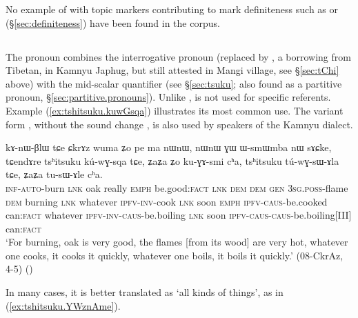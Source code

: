 No example of  with topic markers contributing to mark definiteness such as  or  (§\ref{sec:definiteness}) have been found in the corpus.

\subsection{} \label{sec:tshitsuku}
The pronoun  combines the  interrogative pronoun  (replaced by , a borrowing from Tibetan, in Kamnyu Japhug, but still attested in Mangi village, see §\ref{sec:tChi} above) with the mid-scalar quantifier   (see §\ref{sec:tsuku}; also found as a partitive pronoun, §\ref{sec:partitive.pronouns}).  Unlike  , is not used for specific referents.  Example (\ref{ex:tshitsuku.kuwGsqa}) illustrates its most common use. The variant form , without the sound change  \fl{} , is also used by speakers of the Kamnyu dialect.

\begin{exe}
\ex \label{ex:tshitsuku.kuwGsqa}
\gll kɤ-nɯ-βlɯ tɕe ɕkrɤz wuma ʑo pe ma nɯnɯ, nɯnɯ ɣɯ ɯ-smɯmba nɯ sɤɕke, tɕendɤre tsʰitsuku kú-wɣ-sqa tɕe, ʑaʑa ʑo ku-ɣɤ-smi cʰa, tsʰitsuku tú-wɣ-sɯ-ɤla tɕe, ʑaʑa tu-sɯ-ɤle cʰa. \\
\textsc{inf}-\textsc{auto}-burn \textsc{lnk} oak really \textsc{emph} be.good:\textsc{fact} \textsc{lnk} \textsc{dem} \textsc{dem} \textsc{gen} \textsc{3sg}.\textsc{poss}-flame \textsc{dem} burning \textsc{lnk} whatever \textsc{ipfv}-\textsc{inv}-cook \textsc{lnk} soon \textsc{emph}  \textsc{ipfv}-\textsc{caus}-be.cooked can:\textsc{fact} whatever \textsc{ipfv}-\textsc{inv}-\textsc{caus}-be.boiling \textsc{lnk} soon  \textsc{ipfv}-\textsc{caus}-\textsc{caus}-be.boiling[III] can:\textsc{fact} \\
\glt `For burning, oak is very good, the flames [from its wood] are very hot, whatever one cooks, it cooks it quickly, whatever one boils, it boils it quickly.' (08-CkrAz, 4-5) ()
\end{exe}
 
In many cases, it is better translated as `all kinds of things', as in (\ref{ex:tshitsuku.YWznAme}).

